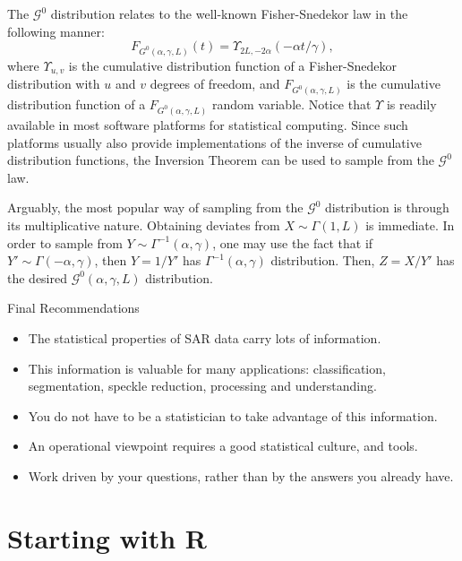 \documentclass{beamer}
\begin{document}
\begin{frame}
The $\mathcal G^0$ distribution relates to the well-known Fisher-Snedekor law in the following manner:
\begin{equation}
F_{G^0(\alpha,\gamma,L)}(t) = \Upsilon_{2L,- 2\alpha}(- \alpha t/\gamma),
\end{equation}
where $\Upsilon_{u,v}$ is the cumulative distribution function of a Fisher-Snedekor distribution with $u$ and $v$ degrees of freedom, and $F_{G^0(\alpha,\gamma,L)}$ is the cumulative distribution function of a $F_{G^0(\alpha,\gamma,L)}$ random variable.
Notice that $\Upsilon$ is readily available in most software platforms for statistical computing.
Since such platforms usually also provide implementations of the inverse of cumulative distribution functions, the Inversion Theorem can be used to sample from the $\mathcal G^0$ law.
\end{frame}

\begin{frame}
Arguably, the most popular way of sampling from the $\mathcal G^0$ distribution is through its multiplicative nature.
Obtaining deviates from $X\sim\Gamma(1,L)$ is immediate.
In order to sample from $Y\sim\Gamma^{-1}(\alpha,\gamma)$, one may use the fact that if $Y'\sim\Gamma(-\alpha,\gamma)$, then $Y=1/Y'$ has $\Gamma^{-1}(\alpha,\gamma)$ distribution.
Then, $Z=X/Y'$ has the desired $\mathcal G^0(\alpha,\gamma,L)$ distribution.
\end{frame}

\begin{frame}{Final Recommendations}
\begin{itemize}
\item The statistical properties of SAR data carry lots of information.
\item This information is valuable for many applications: classification, segmentation, speckle reduction, processing and understanding.
\item You do not have to be a statistician to take advantage of this information.
\item An operational viewpoint requires a good statistical culture, and tools.
\item Work driven by your questions, rather than by the answers you already have.
\end{itemize}
\end{frame}

\section{Starting with R}
\end{document}
